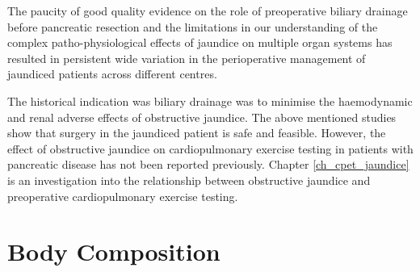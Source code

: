 The paucity of good quality evidence on the role of preoperative biliary drainage before pancreatic resection \parencite{wang_preoperative_2008} and the limitations in our understanding of the complex patho-physiological effects of jaundice on multiple organ systems has resulted in persistent wide variation in the perioperative management of jaundiced patients across different centres.

The historical indication was biliary drainage was to minimise the haemodynamic and renal adverse effects of obstructive jaundice. The above mentioned studies show that surgery in the jaundiced patient is safe and feasible. However, the effect of obstructive jaundice on cardiopulmonary exercise testing in patients with pancreatic disease has not been reported previously. Chapter \ref{ch_cpet_jaundice} is an investigation into the relationship between obstructive jaundice and preoperative cardiopulmonary exercise testing.

\section{Body Composition}
